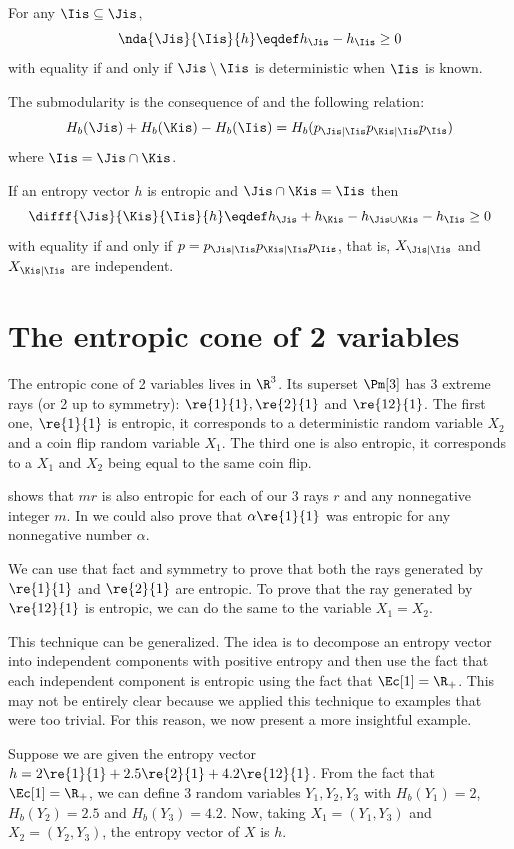 \documentclass[11pt,twoside,a4paper,openright]{uclouvain-thesis}
\begin{document}
\begin{mytheo}
  \label{theo:nondecreasing}
  For any $\Iis \subseteq \Jis$,
  \[ \nda{\Jis}{\Iis}{h} \eqdef h_{\Jis} - h_{\Iis} \geq 0 \]
  with equality if and only if $\Jis\setminus\Iis$ is deterministic when $\Iis$ is known.
\end{mytheo}

The submodularity is the consequence of  and the following relation:
\begin{equation}
  \label{eq:submodular}
  H_b(\Jis) + H_b(\Kis) - H_b(\Iis) = H_b(p_{\Jis|\Iis} p_{\Kis|\Iis} p_{\Iis})
\end{equation}
where $\Iis = \Jis \cap \Kis$.

\begin{mytheo}
  \label{theo:submodular}
  If an entropy vector $h$ is entropic and $\Jis \cap \Kis = \Iis$ then
  \[
    \difff{\Jis}{\Kis}{\Iis}{h} \eqdef
    h_\Jis + h_\Kis - h_{\Jis \cup \Kis} - h_{\Iis}
     \geq 0
  \]
  with equality if and only if $p = p_{\Jis|\Iis} p_{\Kis|\Iis} p_{\Iis}$,
  that is, $X_{\Jis|\Iis}$ and $X_{\Kis|\Iis}$ are independent.
\end{mytheo}



\section{The entropic cone of 2 variables}
\label{sec:2var}
The entropic cone of 2 variables lives in $\R^3$.
Its superset $\Pm[3]$ has 3 extreme rays (or 2 up to symmetry): $\re{1}{1}, \re{2}{1}$ and $\re{12}{1}$.
The first one, $\re{1}{1}$ is entropic, it corresponds to a deterministic random variable $X_2$ and a coin flip random variable $X_1$.
The third one is also entropic, it corresponds to a $X_1$ and $X_2$ being equal to the same coin flip.

 shows that $mr$ is also entropic for each of our 3 rays $r$ and any nonnegative integer $m$.
In  we could also prove that $\alpha \re{1}{1}$ was entropic for any nonnegative number $\alpha$.

We can use that fact and symmetry to prove that both the rays generated by $\re{1}{1}$ and $\re{2}{1}$ are entropic.
To prove that the ray generated by $\re{12}{1}$ is entropic, we can do the same to the variable $X_1 = X_2$.

This technique can be generalized.
The idea is to decompose an entropy vector into independent components with positive entropy and then use the fact that each independent component is entropic using the fact that $\Ec[1] = \R_+$.
This may not be entirely clear because we applied this technique to examples that were too trivial.
For this reason, we now present a more insightful example.
\begin{myexem}
  Suppose we are given the entropy vector $h = 2\re{1}{1} + 2.5\re{2}{1} + 4.2\re{12}{1}$.
  From the fact that $\Ec[1] = \R_+$, we can define 3 random variables $Y_1, Y_2, Y_3$ with $H_b(Y_1) = 2$, $H_b(Y_2) = 2.5$ and $H_b(Y_3) = 4.2$.
  Now, taking $X_1 = (Y_1,Y_3)$ and $X_2 = (Y_2,Y_3)$, the entropy vector of $X$ is $h$.
\end{myexem}
\end{document}
